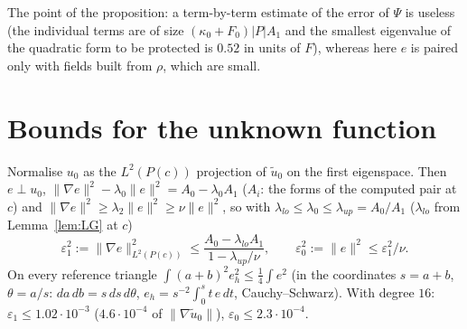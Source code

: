 \documentclass[11pt]{article}
\theoremstyle{remark}
\begin{document}
The point of the proposition: a term-by-term estimate of the error of $\Psi$ is useless (the individual terms are of
size $(\kappa_0+F_0)|P|A_1$ and the smallest eigenvalue of the quadratic form to be protected is $0.52$ in units of
$F$), whereas here $e$ is paired only with fields built from $\rho$, which are small.

\section{Bounds for the unknown function}
Normalise $u_0$ as the $L^2(P(c))$ projection of $\tilde u_0$ on the first eigenspace. Then $e\perp u_0$,
$\|\nabla e\|^2-\lambda_0\|e\|^2=A_0-\lambda_0A_1$ ($A_i$: the forms of the computed pair at $c$) and
$\|\nabla e\|^2\ge\lambda_2\|e\|^2\ge\nu\|e\|^2$, so with $\lambda_{lo}\le\lambda_0\le\lambda_{up}=A_0/A_1$
($\lambda_{lo}$ from Lemma~\ref{lem:LG} at $c$)
\[
\varepsilon_1^2:=\|\nabla e\|^2_{L^2(P(c))}\le\frac{A_0-\lambda_{lo}A_1}{1-\lambda_{up}/\nu},\qquad
\varepsilon_0^2:=\|e\|^2\le\varepsilon_1^2/\nu .
\]
On every reference triangle $\int(a+b)^2e_h^2\le\frac14\int e^2$ (in the coordinates $s=a+b$, $\theta=a/s$:
$da\,db=s\,ds\,d\theta$, $e_h=s^{-2}\int_0^st\,e\,dt$, Cauchy--Schwarz). With degree $16$:
$\varepsilon_1\le1.02\cdot10^{-3}$ ($4.6\cdot10^{-4}$ of $\|\nabla\tilde u_0\|$), $\varepsilon_0\le2.3\cdot10^{-4}$.
\end{document}
